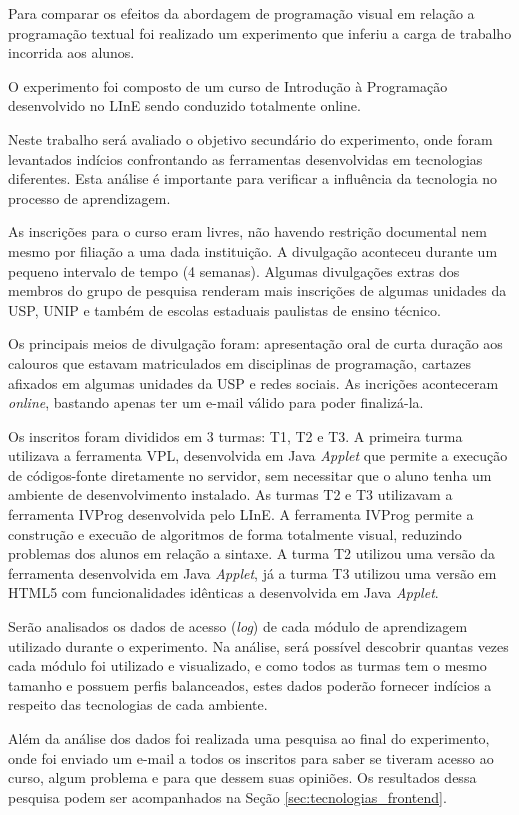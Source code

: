 Para comparar os efeitos da abordagem de programação visual em relação a programação textual foi realizado um experimento que inferiu a carga de trabalho incorrida aos alunos.

O experimento foi composto de um curso de Introdução à Programação desenvolvido no LInE sendo conduzido totalmente online.

Neste trabalho será avaliado o objetivo secundário do experimento, onde foram levantados indícios confrontando as ferramentas desenvolvidas em tecnologias diferentes. Esta análise é importante para verificar a influência da tecnologia no processo de aprendizagem.

As inscrições para o curso eram livres, não havendo restrição documental nem mesmo por filiação a uma dada instituição. A divulgação aconteceu durante um pequeno intervalo de tempo (4 semanas). Algumas divulgações extras dos membros do grupo de pesquisa renderam mais inscrições de algumas unidades da USP, UNIP e também de escolas estaduais paulistas de ensino técnico.

Os principais meios de divulgação foram: apresentação oral de curta duração aos calouros que estavam matriculados em disciplinas de programação, cartazes afixados em algumas unidades da USP e redes sociais. As incrições aconteceram \emph{online}, bastando apenas ter um e-mail válido para poder finalizá-la.

Os inscritos foram divididos em 3 turmas: T1, T2 e T3. A primeira turma utilizava a ferramenta VPL, desenvolvida em Java \emph{Applet} que permite a execução de códigos-fonte diretamente no servidor, sem necessitar que o aluno tenha um ambiente de desenvolvimento instalado. As turmas T2 e T3 utilizavam a ferramenta IVProg desenvolvida pelo LInE. A ferramenta IVProg permite a construção e execuão de algoritmos de forma totalmente visual, reduzindo problemas dos alunos em relação a sintaxe. A turma T2 utilizou uma versão da ferramenta desenvolvida em Java \emph{Applet}, já a turma T3 utilizou uma versão em HTML5 com funcionalidades idênticas a desenvolvida em Java \emph{Applet}.

Serão analisados os dados de acesso (\emph{log}) de cada módulo de aprendizagem utilizado durante o experimento. Na análise, será possível descobrir quantas vezes cada módulo foi utilizado e visualizado, e como todos as turmas tem o mesmo tamanho e possuem perfis balanceados, estes dados poderão fornecer indícios a respeito das tecnologias de cada ambiente. 

Além da análise dos dados foi realizada uma pesquisa ao final do experimento, onde foi enviado um e-mail a todos os inscritos para saber se tiveram acesso ao curso, algum problema e para que dessem suas opiniões. Os resultados dessa pesquisa podem ser acompanhados na Seção \ref{sec:tecnologias_frontend}.


